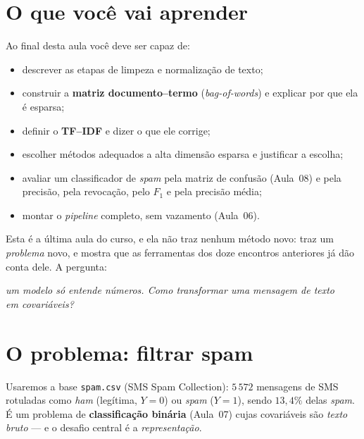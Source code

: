 \documentclass[11pt,a4paper]{article}
\title{}
\date{}
\begin{document}

\section*{O que você vai aprender}
Ao final desta aula você deve ser capaz de:
\begin{itemize}[leftmargin=1.4cm]
  \item descrever as etapas de limpeza e normalização de texto;
  \item construir a \textbf{matriz documento--termo} (\emph{bag-of-words}) e explicar
        por que ela é esparsa;
  \item definir o \textbf{TF--IDF} e dizer o que ele corrige;
  \item escolher métodos adequados a alta dimensão esparsa e justificar a escolha;
  \item avaliar um classificador de \emph{spam} pela matriz de confusão (Aula~08) e
        pela precisão, pela revocação, pelo $F_1$ e pela precisão média;
  \item montar o \emph{pipeline} completo, sem vazamento (Aula~06).
\end{itemize}

\noindent
Esta é a última aula do curso, e ela não traz nenhum método novo: traz um
\emph{problema} novo, e mostra que as ferramentas dos doze encontros anteriores já
dão conta dele. A pergunta:

\begin{center}\itshape
  um modelo só entende números. Como transformar uma mensagem de texto\\
  em covariáveis?
\end{center}

\section{O problema: filtrar spam}
Usaremos a base \texttt{spam.csv} (SMS Spam Collection): $5\,572$ mensagens de
SMS rotuladas como \emph{ham} (legítima, $Y=0$) ou \emph{spam} ($Y=1$), sendo
$13{,}4\%$ delas \emph{spam}. É um problema de \textbf{classificação binária}
(Aula~07) cujas covariáveis são \emph{texto bruto} --- e o desafio central é a
\emph{representação}.
\end{document}
